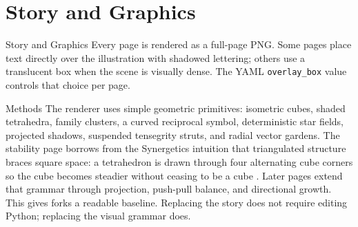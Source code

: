 \documentclass[
  ignorenonframetext,
]{beamer}
\author{\texorpdfstring{}{}}
\date{}
\begin{document}
\section{Story and Graphics}\label{story-and-graphics}

\begin{frame}{Story and Graphics}
Every page is rendered as a full-page PNG. Some pages place text
directly over the illustration with shadowed lettering; others use a
translucent box when the scene is visually dense. The YAML
\texttt{overlay\_box} value controls that choice per page.
\end{frame}

\begin{frame}[allowframebreaks]{Methods}
\protect{}\label{methods}
The renderer uses simple geometric primitives: isometric cubes, shaded
tetrahedra, family clusters, a curved reciprocal symbol, deterministic
star fields, projected shadows, suspended tensegrity struts, and radial
vector gardens. The stability page borrows from the Synergetics
intuition that triangulated structure braces square space: a tetrahedron
is drawn through four alternating cube corners so the cube becomes
steadier without ceasing to be a cube .
Later pages extend that grammar through projection, push-pull balance,
and directional growth. This gives forks a readable baseline. Replacing
the story does not require editing Python; replacing the visual grammar
does.
\end{frame}
\end{document}

